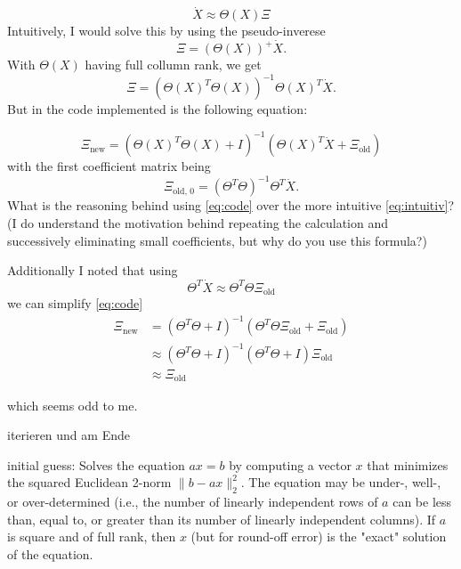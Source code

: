 \documentclass[arbeit=studie,oneside,BCOR=12mm]{ArbeitRST}
\begin{document}
\begin{equation}
\dot{X} \approx \Theta(X)\Xi
\end{equation}
Intuitively, I would solve this by using the pseudo-inverese 
\begin{equation}
\Xi = \left(\Theta(X)\right)^+\dot{X}.
\end{equation}
With $\Theta(X)$ having full collumn rank, we get
\begin{equation}
\Xi = \left(\Theta(X)^T\Theta(X)\right)^{-1}\Theta(X)^T\dot{X}.\label{eq:intuitiv}
\end{equation}
But in the code implemented is the following equation: 

\begin{equation}
\Xi_\text{new} = \left(\Theta(X)^T\Theta(X) + I \right)^{-1} \left(\Theta(X)^T\dot{X} + \Xi_{\text{old}} \right)\label{eq:code}
\end{equation}
with the first coefficient matrix being
\begin{equation}
\Xi_\text{old, 0} = \left(\Theta^T\Theta\right)^{-1}\Theta^T \dot{X}.
\end{equation}
What is the reasoning behind using \ref{eq:code} over the more intuitive \ref{eq:intuitiv}? (I do understand the motivation behind repeating the calculation and successively eliminating small coefficients, but why do you use this formula?)

Additionally I noted that using
\begin{equation}
\Theta^T\dot{X} \approx \Theta^T\Theta\Xi_\text{old}
\end{equation}
we can simplify \ref{eq:code}
\begin{equation}
\begin{aligned}
\Xi_\text{new} &= \left(\Theta^T\Theta + I \right)^{-1} \left(\Theta^T\Theta\Xi_\text{old} + \Xi_\text{old} \right)\\
&\approx\left(\Theta^T\Theta + I \right)^{-1} \left(\Theta^T\Theta+I\right)\Xi_\text{old} \\
&\approx\Xi_\text{old}
\end{aligned}
\end{equation}

which seems odd to me.


iterieren und am Ende


initial guess: Solves the equation $a x = b$ by computing a vector $x$ that
    minimizes the squared Euclidean 2-norm $\| b - a x \|^2_2$.
    The equation may be under-, well-, or over-determined (i.e., the
    number of linearly independent rows of $a$ can be less than, equal
    to, or greater than its number of linearly independent columns).
    If $a$ is square and of full rank, then $x$ (but for round-off error)
    is the "exact" solution of the equation.
\end{document}
